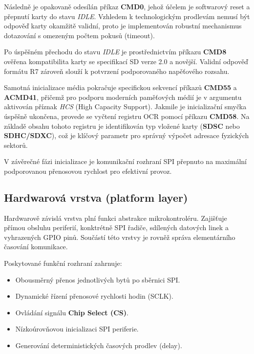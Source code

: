 \documentclass[11pt, a4paper, plain]{article}
\begin{document}
Následně je opakovaně odesílán příkaz \textbf{CMD0}, jehož účelem je softwarový reset a přepnutí
karty do stavu \textit{IDLE}. Vzhledem k technologickým prodlevám nemusí být odpověď karty okamžitě
validní, proto je implementován robustní mechanismus dotazování s omezeným počtem pokusů (timeout).

Po úspěšném přechodu do stavu \textit{IDLE} je prostřednictvím příkazu \textbf{CMD8} ověřena
kompatibilita karty se specifikací SD verze 2.0 a novější. Validní odpověď formátu R7 zároveň slouží
k potvrzení podporovaného napěťového rozsahu.

Samotná inicializace média pokračuje specifickou sekvencí příkazů \textbf{CMD55} a \textbf{ACMD41},
přičemž pro podporu moderních paměťových médií je v argumentu aktivován příznak \textit{HCS} (High
Capacity Support). Jakmile je inicializační smyčka úspěšně ukončena, provede se vyčtení registru OCR
pomocí příkazu \textbf{CMD58}. Na základě obsahu tohoto registru je identifikován typ vložené karty
(\textbf{SDSC} nebo \textbf{SDHC/SDXC}), což je klíčový parametr pro správný výpočet adresace
fyzických sektorů.

V závěrečné fázi inicializace je komunikační rozhraní SPI přepnuto na maximální podporovanou
přenosovou rychlost pro efektivní provoz.

\subsection{Hardwarová vrstva (platform layer)}

Hardwarově závislá vrstva plní funkci abstrakce mikrokontroléru. Zajišťuje přímou obsluhu periferií,
konktrétně SPI řadiče, sdílených datových linek a vyhrazených GPIO pinů. Součástí této vrstvy je
rovněž správa elementárního časování komunikace.

Poskytované funkční rozhraní zahrnuje:

\begin{itemize}
    \item Obousměrný přenos jednotlivých bytů po sběrnici SPI.
    \item Dynamické řízení přenosové rychlosti hodin (SCLK).
    \item Ovládání signálu \textbf{Chip Select (CS)}.
    \item Nízkoúrovňovou inicializaci SPI periferie.
    \item Generování deterministických časových prodlev (delay).
\end{itemize}
\end{document}
